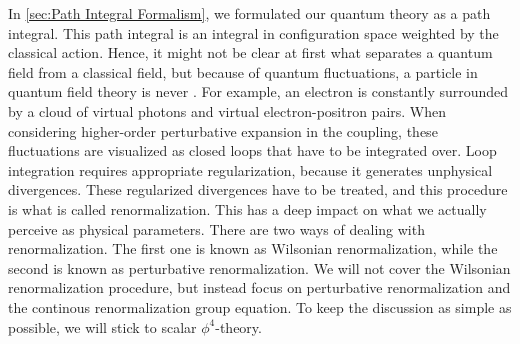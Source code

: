 In \cref{sec:Path Integral Formalism}, we formulated our quantum theory as a path integral. This path integral is an integral in configuration space weighted by the classical action. Hence, it might not be clear at first what separates a quantum field from a classical field, but because of quantum fluctuations, a particle in quantum field theory is never . For example, an electron is constantly surrounded by a cloud of virtual photons and virtual electron-positron pairs. When considering higher-order perturbative expansion in the coupling, these fluctuations are visualized as closed loops that have to be integrated over. Loop integration requires appropriate regularization, because it generates unphysical divergences. These regularized divergences have to be treated, and this procedure is what is called renormalization. This has a deep impact on what we actually perceive as physical parameters. There are two ways of dealing with renormalization. The first one is known as Wilsonian renormalization, while the second is known as perturbative renormalization. We will not cover the Wilsonian renormalization procedure, but instead focus on perturbative renormalization and the continous renormalization group equation. To keep the discussion as simple as possible, we will stick to scalar $\phi
^{4}$-theory.


